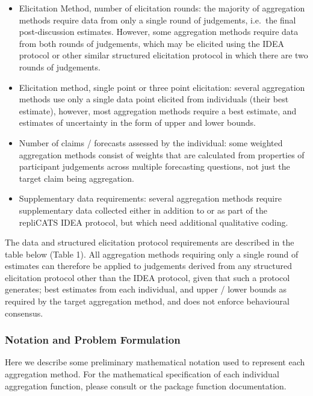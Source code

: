 \documentclass[article]{jss}
\providecommand{\tightlist}{%
  \setlength{\itemsep}{0pt}\setlength{\parskip}{0pt}}\usepackage{longtable,booktabs,array}
\begin{document}
\begin{itemize}
\tightlist
\item
  Elicitation Method, number of elicitation rounds: the majority of
  aggregation methods require data from only a single round of
  judgements, i.e.~the final post-discussion estimates. However, some
  aggregation methods require data from both rounds of judgements, which
  may be elicited using the IDEA protocol or other similar structured
  elicitation protocol in which there are two rounds of judgements.
\item
  Elicitation method, single point or three point elicitation: several
  aggregation methods use only a single data point elicited from
  individuals (their best estimate), however, most aggregation methods
  require a best estimate, and estimates of uncertainty in the form of
  upper and lower bounds.
\item
  Number of claims / forecasts assessed by the individual: some weighted
  aggregation methods consist of weights that are calculated from
  properties of participant judgements across multiple forecasting
  questions, not just the target claim being aggregation.
\item
  Supplementary data requirements: several aggregation methods require
  supplementary data collected either in addition to or as part of the
  repliCATS IDEA protocol, but which need additional qualitative coding.
\end{itemize}

The data and structured elicitation protocol requirements are described
in the table below (Table 1). All aggregation methods requiring only a
single round of estimates can therefore be applied to judgements derived
from any structured elicitation protocol other than the IDEA protocol,
given that such a protocol generates; best estimates from each
individual, and upper / lower bounds as required by the target
aggregation method, and does not enforce behavioural consensus.

\hypertarget{notation-and-problem-formulation}{%
\subsubsection{Notation and Problem
Formulation}\label{notation-and-problem-formulation}}

Here we describe some preliminary mathematical notation used to
represent each aggregation method. For the mathematical specification of
each individual aggregation function, please consult \citep{Hanea2021}
or the  package function documentation.
\end{document}
